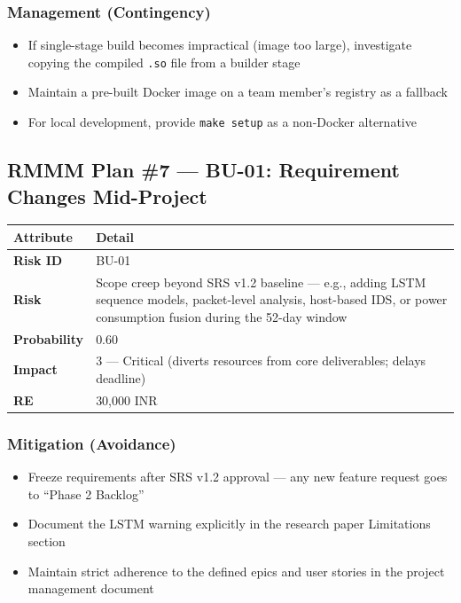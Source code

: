 \documentclass[11pt, a4paper]{article}
\newcommand{\col}[1]{\texttt{\small #1}}
\begin{document}
\subsubsection*{Management (Contingency)}
\begin{itemize}[leftmargin=*]
    \item If single-stage build becomes impractical (image too large), investigate copying the compiled \col{.so} file from a builder stage
    \item Maintain a pre-built Docker image on a team member's registry as a fallback
    \item For local development, provide \col{make setup} as a non-Docker alternative
\end{itemize}

\subsection{RMMM Plan \#7 --- BU-01: Requirement Changes Mid-Project}

\begin{center}
\small
\begin{tabular}{|l|p{10cm}|}
\hline
\rowcolor{orange!10}
\textbf{Attribute} & \textbf{Detail} \\
\hline
\textbf{Risk ID} & BU-01 \\
\hline
\textbf{Risk} & Scope creep beyond SRS v1.2 baseline --- e.g., adding LSTM sequence models, packet-level analysis, host-based IDS, or power consumption fusion during the 52-day window \\
\hline
\textbf{Probability} & 0.60 \\
\hline
\textbf{Impact} & 3 --- Critical (diverts resources from core deliverables; delays deadline) \\
\hline
\textbf{RE} & 30,000 INR \\
\hline
\end{tabular}
\normalsize
\end{center}

\subsubsection*{Mitigation (Avoidance)}
\begin{itemize}[leftmargin=*]
    \item Freeze requirements after SRS v1.2 approval --- any new feature request goes to ``Phase 2 Backlog''
    \item Document the LSTM warning explicitly in the research paper Limitations section
    \item Maintain strict adherence to the defined epics and user stories in the project management document
\end{itemize}
\end{document}
